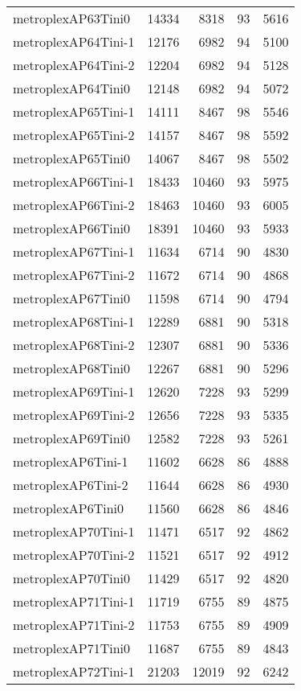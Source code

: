 \begin{longtable}{lrrrr}
metroplexAP63Tini0 & 14334 & 8318 & 93 & 5616 \\
metroplexAP64Tini-1 & 12176 & 6982 & 94 & 5100 \\
metroplexAP64Tini-2 & 12204 & 6982 & 94 & 5128 \\
metroplexAP64Tini0 & 12148 & 6982 & 94 & 5072 \\
metroplexAP65Tini-1 & 14111 & 8467 & 98 & 5546 \\
metroplexAP65Tini-2 & 14157 & 8467 & 98 & 5592 \\
metroplexAP65Tini0 & 14067 & 8467 & 98 & 5502 \\
metroplexAP66Tini-1 & 18433 & 10460 & 93 & 5975 \\
metroplexAP66Tini-2 & 18463 & 10460 & 93 & 6005 \\
metroplexAP66Tini0 & 18391 & 10460 & 93 & 5933 \\
metroplexAP67Tini-1 & 11634 & 6714 & 90 & 4830 \\
metroplexAP67Tini-2 & 11672 & 6714 & 90 & 4868 \\
metroplexAP67Tini0 & 11598 & 6714 & 90 & 4794 \\
metroplexAP68Tini-1 & 12289 & 6881 & 90 & 5318 \\
metroplexAP68Tini-2 & 12307 & 6881 & 90 & 5336 \\
metroplexAP68Tini0 & 12267 & 6881 & 90 & 5296 \\
metroplexAP69Tini-1 & 12620 & 7228 & 93 & 5299 \\
metroplexAP69Tini-2 & 12656 & 7228 & 93 & 5335 \\
metroplexAP69Tini0 & 12582 & 7228 & 93 & 5261 \\
metroplexAP6Tini-1 & 11602 & 6628 & 86 & 4888 \\
metroplexAP6Tini-2 & 11644 & 6628 & 86 & 4930 \\
metroplexAP6Tini0 & 11560 & 6628 & 86 & 4846 \\
metroplexAP70Tini-1 & 11471 & 6517 & 92 & 4862 \\
metroplexAP70Tini-2 & 11521 & 6517 & 92 & 4912 \\
metroplexAP70Tini0 & 11429 & 6517 & 92 & 4820 \\
metroplexAP71Tini-1 & 11719 & 6755 & 89 & 4875 \\
metroplexAP71Tini-2 & 11753 & 6755 & 89 & 4909 \\
metroplexAP71Tini0 & 11687 & 6755 & 89 & 4843 \\
metroplexAP72Tini-1 & 21203 & 12019 & 92 & 6242 \\

\end{longtable}
